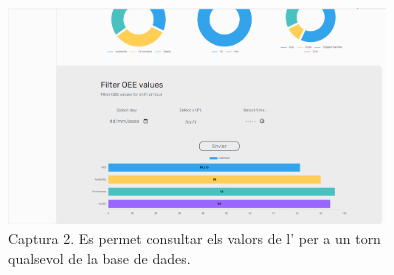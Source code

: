 \documentclass{tfgitic}[2022/06/30]
\begin{document}
\begin{figure}[h]
\centering
\includegraphics[width=10cm]{img/webScreenshot02.png}
\caption{Captura 2. Es permet consultar els valors de l' per a un torn qualsevol de la base de dades.}
\label{webScreen02}
\end{figure}
\end{document}
